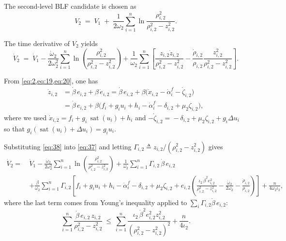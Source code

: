 \documentclass[pdflatex,sn-mathphys-num]{sn-jnl}%
\theoremstyle{thmstyleone}%
\theoremstyle{thmstyletwo}%
\theoremstyle{thmstylethree}%
\begin{document}
	
	
	The second-level BLF candidate is chosen as
\begin{equation}\label{eq:36}
  V_2 \;=\; V_1 \;+\; \frac{1}{2\omega_2}\sum_{i=1}^{n}\ln\frac{\rho_{i,2}^2}{\rho_{i,2}^2 - z_{i,2}^2}.
\end{equation}

The time derivative of $V_2$ yields
\begin{equation}\label{eq:37}
  \dot V_2 \;=\; \dot V_1
  -\frac{\dot\omega_2}{2\omega_2^2}\sum_{i=1}^{n}\ln\!\left(\frac{\rho_{i,2}^2}{\rho_{i,2}^2 - z_{i,2}^2}\right)
  +\frac{1}{\omega_2}\sum_{i=1}^{n}\!\left[
      \frac{z_{i,2}\dot z_{i,2}}{\rho_{i,2}^2 - z_{i,2}^2}
      -\frac{\dot\rho_{i,2}}{\rho_{i,2}}\frac{z_{i,2}^2}{\rho_{i,2}^2 - z_{i,2}^2}
  \right].
\end{equation}

From \cref{eq:2,eq:19,eq:20}, one has
\begin{equation}\label{eq:38}
\begin{aligned}
  \dot z_{i,2}
  &= \dot\beta\,e_{i,2} + \beta\,\dot e_{i,2}
   = \dot\beta\,e_{i,2} + \beta\big(\dot x_{i,2} - \dot\alpha^f_i - \dot\zeta_{i,2}\big) \\
  &= \dot\beta\,e_{i,2} + \beta\big(f_i + g_i u_i + h_i - \dot\alpha^f_i - \delta_{i,2} + \mu_2\zeta_{i,2}\big),
\end{aligned}
\end{equation}
where we used $\dot x_{i,2}=f_i+g_i\,\operatorname{sat}(u_i)+h_i$ and
$-\dot\zeta_{i,2}=\!-\delta_{i,2}+\mu_2\zeta_{i,2}+g_i\Delta u_i$ so that
$g_i(\operatorname{sat}(u_i)+\Delta u_i)=g_i u_i$.

Substituting \eqref{eq:38} into \eqref{eq:37} and letting
$\Gamma_{i,2}\triangleq z_{i,2}/(\rho_{i,2}^2 - z_{i,2}^2)$ gives
\begin{equation}\label{eq:39}
\begin{aligned}
  \dot V_2
  =\ & \dot V_1
      -\frac{\dot\omega_2}{2\omega_2^2}\sum_{i=1}^{n}\ln\!\left(\frac{\rho_{i,2}^2}{\rho_{i,2}^2 - z_{i,2}^2}\right)
      + \frac{1}{\omega_2}\sum_{i=1}^{n}\Gamma_{i,2}\,\dot\beta\,e_{i,2}  \\
    & + \frac{\beta}{\omega_2}\sum_{i=1}^{n}\Gamma_{i,2}\!\left[
        f_i + g_i u_i + h_i - \dot\alpha^f_i - \delta_{i,2} + \mu_2\zeta_{i,2}
        + e_{i,2}\!\left(
            \frac{\iota_2\,\dot\beta^{2} e_{i,2}^{2}}{\rho_{i,2}^{2}-z_{i,2}^{2}}
           -\frac{\dot\omega_2}{2\omega_2}
           -\frac{\dot\rho_{i,2}}{\rho_{i,2}}
        \right)
      \right]
      + \frac{n}{4\omega_2\iota_2},
\end{aligned}
\end{equation}
where the last term comes from Young’s inequality applied to
$\sum_i \Gamma_{i,2}\dot\beta\,e_{i,2}$:
\begin{equation}\label{eq:43}
  \sum_{i=1}^{n}\frac{\dot\beta\,e_{i,2}\,z_{i,2}}{\rho_{i,2}^{2}-z_{i,2}^{2}}
  \ \le\
  \sum_{i=1}^{n}\frac{\iota_2\,\dot\beta^{2} e_{i,2}^{2} z_{i,2}^{2}}{(\rho_{i,2}^{2}-z_{i,2}^{2})^{2}}
  + \frac{n}{4\iota_2}.
\end{equation}
\end{document}
